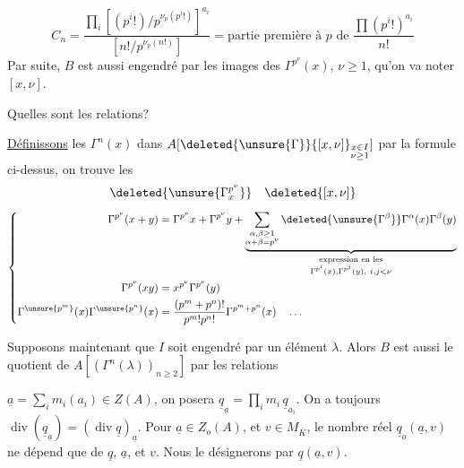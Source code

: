 \[
C_n=\frac{\prod_i[(p^i!)/p^{\nu_p(p^i!)}]^{a_i}}{[n!/p^{\nu_p(n!)}]}=\text{partie première à }p\text{ de }\frac{\prod(p^i!)^{a_i}}{n!}
\]
Par suite, $B$ est aussi engendré par les images des $\Gamma^{p^\nu}(x)$, $\nu\geq1$, qu'on va noter $[x,\nu]$.

Quelles sont les relations?

\uline{Définissons} les $\Gamma^n(x)$ dans $A[\deleted{\unsure{\Gamma}}\{[x,\nu]\}_{\substack{x\in I\\\nu\geq1}}]$ par la formule ci-dessus,  on trouve les  
\[
\deleted{\unsure{\Gamma_x^{p^\nu}}}\quad\deleted{[x,\nu]}
\]
\[
\left\{\begin{aligned}
\Gamma^{p^\nu}(x+y)&=\Gamma^{p^\nu}x+\Gamma^{p^\nu}y+\underbrace{\sum_{\substack{\alpha,\beta\geq1\\\alpha+\beta=p^\nu}}\deleted{\unsure{\Gamma^\beta}}\Gamma^\alpha(x)\Gamma^\beta(y)}_{\substack{\text{expression en les}\\\Gamma^{p^i}(x),\Gamma^{p^j}(y),\ i,j<\nu}}\\
\Gamma^{p^\nu}(xy)&=x^{p^\nu}\Gamma^{p^\nu}(y)\\
\Gamma^{\unsure{p^m}}(x)\Gamma^{\unsure{p^n}}(x)&=\frac{(p^m+p^n)!}{p^m!p^n!}\Gamma^{p^m+p^n}(x)\quad\ldots
\end{aligned}\right.
\]


Supposons maintenant que $I$ soit engendré par un élément $\lambda$. Alors $B$ est aussi  le quotient de $A[(\Gamma^n(\lambda))_{n\geq2}]$ par les relations


$\underline a=\sum_i m_i(a_i)\in Z(A)$, on posera $\underline q_{\underline a}=\prod_i m_i\,\underline q_{a_i}$. On a toujours $\operatorname{div}(\underline q_{\underline a})=(\operatorname{div}\underline q)_{\underline a}$. Pour $\underline a\in Z_o(A)$, et $v\in M_{\overline K}$, le nombre réel $\underline q_o(\underline a,v)$ ne dépend que de $\underline q$, $\underline a$, et $v$. Nous le désignerons par $\underline q(\underline a,v)$.

